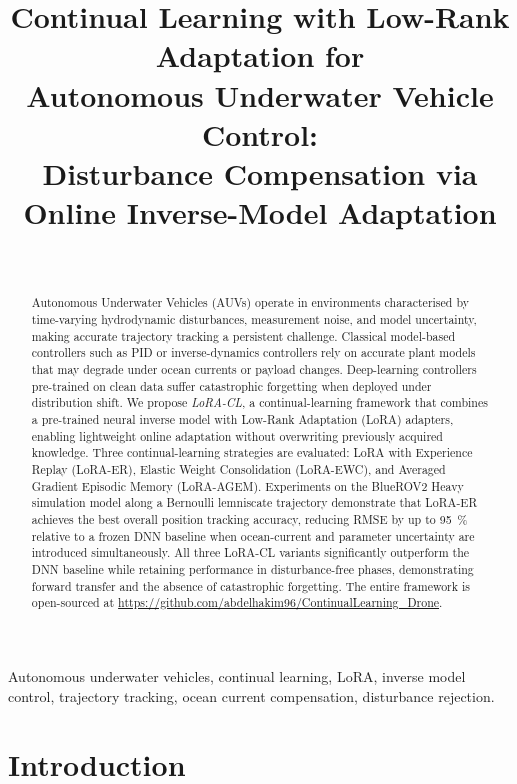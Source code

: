 \documentclass[journal]{IEEEtran}
\title{Continual Learning with Low-Rank Adaptation for\\
       Autonomous Underwater Vehicle Control:\\
       Disturbance Compensation via Online Inverse-Model Adaptation}
\author{%
  \IEEEauthorblockN{Abdelhakim~Amer}\\
  \IEEEauthorblockA{Department of Engineering Cybernetics\\
    Norwegian University of Science and Technology (NTNU)\\
    Trondheim, Norway\\
    \textit{abdelhakim.amer@ntnu.no}}
}
\begin{document}
\maketitle

\begin{abstract}
Autonomous Underwater Vehicles (AUVs) operate in environments characterised
by time-varying hydrodynamic disturbances, measurement noise, and model
uncertainty, making accurate trajectory tracking a persistent challenge.
Classical model-based controllers such as PID or inverse-dynamics controllers
rely on accurate plant models that may degrade under ocean currents or payload
changes. Deep-learning controllers pre-trained on clean data suffer
catastrophic forgetting when deployed under distribution shift.
We propose \emph{LoRA-CL}, a continual-learning framework that combines a
pre-trained neural inverse model with Low-Rank Adaptation (LoRA) adapters,
enabling lightweight online adaptation without overwriting previously
acquired knowledge. Three continual-learning strategies are evaluated:
LoRA with Experience Replay (LoRA-ER), Elastic Weight Consolidation
(LoRA-EWC), and Averaged Gradient Episodic Memory (LoRA-AGEM).
Experiments on the BlueROV2 Heavy simulation model along a Bernoulli
lemniscate trajectory demonstrate that LoRA-ER achieves the best overall
position tracking accuracy, reducing RMSE by up to \SI{95}{\percent}
relative to a frozen DNN baseline when ocean-current and parameter
uncertainty are introduced simultaneously. All three LoRA-CL variants
significantly outperform the DNN baseline while retaining performance in
disturbance-free phases, demonstrating forward transfer and the absence of
catastrophic forgetting. The entire framework is open-sourced at
\url{https://github.com/abdelhakim96/ContinualLearning_Drone}.
\end{abstract}

\begin{IEEEkeywords}
Autonomous underwater vehicles, continual learning, LoRA, inverse model
control, trajectory tracking, ocean current compensation, disturbance rejection.
\end{IEEEkeywords}

\section{Introduction}
\label{sec:intro}
\end{document}

